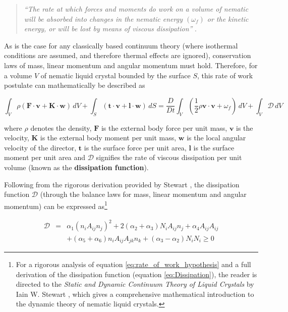 \begin{quote}
\textit{``The rate at which forces and moments do work on a volume of nematic will be absorbed into changes in the nematic energy $\left(\omega_f\right)$ or the kinetic energy, or will be lost by means of viscous dissipation''} \cite{Stewart2004}.
\end{quote}

\noindent As is the case for any classically based continuum theory (where isothermal conditions are assumed, and therefore thermal effects are ignored), conservation laws of mass, linear momentum and angular momentum must hold. Therefore, for a volume $V$ of nematic liquid crystal bounded by the surface $S$, this rate of work postulate can mathematically be described as 

\begin{equation}
\int_V \! \rho\left(\mathbf{F}\cdot\mathbf{v}+\mathbf{K}\cdot\mathbf{w}\right)\,dV+\int_S\!\left(\mathbf{t}\cdot\mathbf{v}+\mathbf{l}\cdot\mathbf{w}\right)\,dS=\frac{D}{Dt}\int_V\!\left(\frac{1}{2}\rho\mathbf{v}\cdot\mathbf{v}+\omega_f\right)\,dV+\int_V\!\mathcal{D}\,dV
\label{eq:rate_of_work_hypothesis}
\end{equation}

\noindent where $\rho$ denotes the density, $\mathbf{F}$ is the external body force per unit mass, $\mathbf{v}$ is the velocity, $\mathbf{K}$ is the external body moment per unit mass, $\mathbf{w}$ is the local angular velocity of the director, $\mathbf{t}$ is the surface force per unit area, $\mathbf{l}$ is the surface moment per unit area and $\mathcal{D}$ signifies the rate of viscous dissipation per unit volume (known as the \textbf{dissipation function}).

Following from the rigorous derivation provided by Stewart \cite{Stewart2004}, the dissipation function $\mathcal{D}$ (through the balance laws for mass, linear momentum and angular momentum) can be expressed as\footnote{For a rigorous analysis of equation \ref{eq:rate_of_work_hypothesis} and a full derivation of the dissipation function (equation \ref{eq:Dissipation}), the reader is directed to the \textit{Static and Dynamic Continuum Theory of Liquid Crystals} by Iain W. Stewart \cite{Stewart2004}, which gives a comprehensive mathematical introduction to the dynamic theory of nematic liquid crystals.}

\begin{eqnarray}
\nonumber\mathcal{D}&=&\alpha_1\left(n_iA_{ij}n_j\right)^2+2\left(\alpha_2+\alpha_3\right)N_iA_{ij}n_j+\alpha_4A_{ij}A_{ij}\\
&&+\left(\alpha_5+\alpha_6\right)n_iA_{ij}A_{jk}n_k+\left(\alpha_3-\alpha_2\right)N_iN_i\geq0
\label{eq:Dissipation}
\end{eqnarray}

